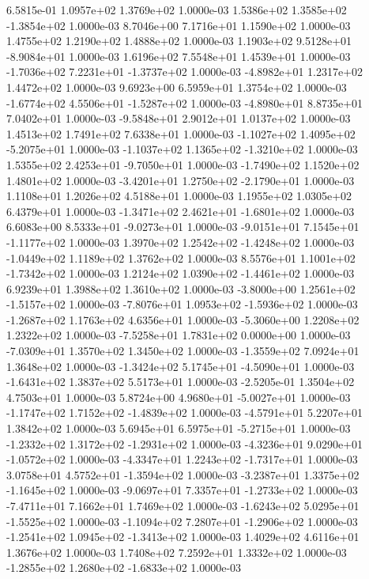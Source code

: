 6.5815e-01 1.0957e+02 1.3769e+02  1.0000e-03
 1.5386e+02  1.3585e+02 -1.3854e+02  1.0000e-03
8.7046e+00 7.1716e+01 1.1590e+02  1.0000e-03
1.4755e+02 1.2190e+02 1.4888e+02  1.0000e-03
 1.1903e+02  9.5128e+01 -8.9084e+01  1.0000e-03
1.6196e+02 7.5548e+01 1.4539e+01  1.0000e-03
-1.7036e+02  7.2231e+01 -1.3737e+02  1.0000e-03
-4.8982e+01  1.2317e+02  1.4472e+02  1.0000e-03
9.6923e+00 6.5959e+01 1.3754e+02  1.0000e-03
-1.6774e+02  4.5506e+01 -1.5287e+02  1.0000e-03
-4.8980e+01  8.8735e+01  7.0402e+01  1.0000e-03
-9.5848e+01  2.9012e+01  1.0137e+02  1.0000e-03
1.4513e+02 1.7491e+02 7.6338e+01  1.0000e-03
-1.1027e+02  1.4095e+02 -5.2075e+01  1.0000e-03
-1.1037e+02  1.1365e+02 -1.3210e+02  1.0000e-03
 1.5355e+02  2.4253e+01 -9.7050e+01  1.0000e-03
-1.7490e+02  1.1520e+02  1.4801e+02  1.0000e-03
-3.4201e+01  1.2750e+02 -2.1790e+01  1.0000e-03
1.1108e+01 1.2026e+02 4.5188e+01  1.0000e-03
1.1955e+02 1.0305e+02 6.4379e+01  1.0000e-03
-1.3471e+02  2.4621e+01 -1.6801e+02  1.0000e-03
 6.6083e+00  8.5333e+01 -9.0273e+01  1.0000e-03
-9.0151e+01  7.1545e+01 -1.1177e+02  1.0000e-03
 1.3970e+02  1.2542e+02 -1.4248e+02  1.0000e-03
-1.0449e+02  1.1189e+02  1.3762e+02  1.0000e-03
 8.5576e+01  1.1001e+02 -1.7342e+02  1.0000e-03
 1.2124e+02  1.0390e+02 -1.4461e+02  1.0000e-03
6.9239e+01 1.3988e+02 1.3610e+02  1.0000e-03
-3.8000e+00  1.2561e+02 -1.5157e+02  1.0000e-03
-7.8076e+01  1.0953e+02 -1.5936e+02  1.0000e-03
-1.2687e+02  1.1763e+02  4.6356e+01  1.0000e-03
-5.3060e+00  1.2208e+02  1.2322e+02  1.0000e-03
-7.5258e+01  1.7831e+02  0.0000e+00  1.0000e-03
-7.0309e+01  1.3570e+02  1.3450e+02  1.0000e-03
-1.3559e+02  7.0924e+01  1.3648e+02  1.0000e-03
-1.3424e+02  5.1745e+01 -4.5090e+01  1.0000e-03
-1.6431e+02  1.3837e+02  5.5173e+01  1.0000e-03
-2.5205e-01  1.3504e+02  4.7503e+01  1.0000e-03
 5.8724e+00  4.9680e+01 -5.0027e+01  1.0000e-03
-1.1747e+02  1.7152e+02 -1.4839e+02  1.0000e-03
-4.5791e+01  5.2207e+01  1.3842e+02  1.0000e-03
 5.6945e+01  6.5975e+01 -5.2715e+01  1.0000e-03
-1.2332e+02  1.3172e+02 -1.2931e+02  1.0000e-03
-4.3236e+01  9.0290e+01 -1.0572e+02  1.0000e-03
-4.3347e+01  1.2243e+02 -1.7317e+01  1.0000e-03
 3.0758e+01  4.5752e+01 -1.3594e+02  1.0000e-03
-3.2387e+01  1.3375e+02 -1.1645e+02  1.0000e-03
-9.0697e+01  7.3357e+01 -1.2733e+02  1.0000e-03
-7.4711e+01  7.1662e+01  1.7469e+02  1.0000e-03
-1.6243e+02  5.0295e+01 -1.5525e+02  1.0000e-03
-1.1094e+02  7.2807e+01 -1.2906e+02  1.0000e-03
-1.2541e+02  1.0945e+02 -1.3413e+02  1.0000e-03
1.4029e+02 4.6116e+01 1.3676e+02  1.0000e-03
1.7408e+02 7.2592e+01 1.3332e+02  1.0000e-03
-1.2855e+02  1.2680e+02 -1.6833e+02  1.0000e-03

